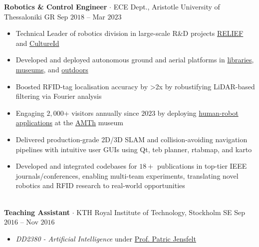 \documentclass[a4paper,10pt,twoside]{article}
\begin{document}
  \noindent\textbf{Robotics \& Control Engineer} $\cdot$ ECE Dept., Aristotle University of Thessaloniki GR \hfill {\small \textcolor{agray}{Sep $2018$ -- Mar $2023$}} \\
  \begin{minipage}[t]{\textwidth}
    \begin{itemize}
      \item Technical Leader of robotics division in large-scale R\&D projects \href{https://relief.web.auth.gr/language/en/home/}{RELIEF} and \href{https://cultureid.web.auth.gr/?page\_id=200&lang=en}{CultureId} \verticalspaceafteritem
      \item Developed and deployed autonomous ground and aerial platforms in \href{https://www.youtube.com/watch?v=bo4lMI640DY}{libraries}, \href{https://youtu.be/2EvTGNOqTrs?t=17}{museums}, and \href{https://www.youtube.com/watch?v=0YFQzpWgEd4}{outdoors}\verticalspaceafteritem
      \item Boosted RFID-tag localisation accuracy by >2x by robustifying LiDAR-based filtering via Fourier analysis\verticalspaceafteritem
      \item Engaging $2,000$+ visitors annually since $2023$ by deploying \href{https://www.youtube.com/watch?v=mrTL3Gep7Xk&t=36s}{human-robot applications} at the \href{https://www.amth.gr/en}{AMTh} museum\verticalspaceafteritem
      \item Delivered production-grade 2D/3D SLAM and collision-avoiding navigation pipelines with intuitive user GUIs using Qt, teb planner, rtabmap, and karto\verticalspaceafteritem
      \item Developed and integrated codebases for $18+$ publications in top-tier IEEE journals/conferences, enabling multi-team experiments, translating novel robotics and RFID research to real-world opportunities
    \end{itemize}
  \end{minipage} \\[0.2em]

  \noindent\textbf{Teaching Assistant} $\cdot$ KTH Royal Institute of Technology, Stockholm SE \hfill {\small \textcolor{agray}{Sep $2016$ -- Nov $2016$}} \\
  \begin{minipage}[t]{\textwidth}
    \begin{itemize}
      \item \textit{DD2380 - Artificial Intelligence} under \href{https://www.kth.se/profile/patric}{Prof. Patric Jensfelt}
    \end{itemize}
  \end{minipage} \\[-1em]
\verticalspacebetweensections
\end{document}
